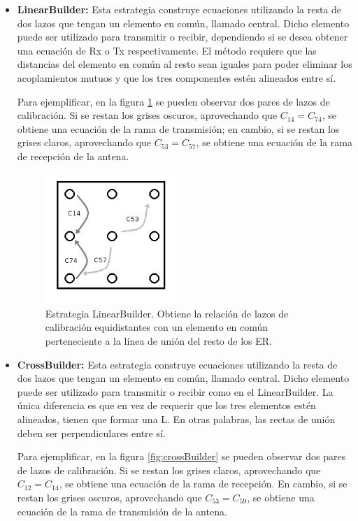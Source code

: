 \begin{itemize}
	\item \textbf{LinearBuilder:} Esta estrategia construye ecuaciones utilizando la resta de dos lazos que tengan un elemento en 
		común, llamado central. Dicho elemento puede ser utilizado para transmitir o recibir, dependiendo si se desea obtener una 
        ecuación de Rx o Tx respectivamente. El método requiere que las distancias del elemento en común al resto sean iguales
		para poder eliminar los acoplamientos mutuos y que los tres componentes estén alineados entre sí.
         
		Para ejemplificar, en la figura \ref{fig:linealBuilder} se pueden observar dos pares de lazos de calibración. Si se
		restan los grises oscuros, aprovechando que $C_{14} = C_{74}$, se obtiene una ecuación de la rama de transmisión; en
		cambio, si se restan los grises claros, aprovechando que $C_{53} = C_{57}$, se obtiene una ecuación de la rama de
		recepción de la antena.
			
		\begin{figure}[H]
		 \centering
		 \includegraphics[width=5cm]{gfx/linearBuilder.png}
		 \caption{Estrategia LinearBuilder. Obtiene la relación de lazos de calibración equidistantes con un elemento en común
		 perteneciente a la línea de unión del resto de los ER.}
		 \label{fig:linealBuilder}
		\end{figure}

	\item \textbf{CrossBuilder:} Esta estrategia construye ecuaciones utilizando la resta de dos lazos que tengan un elemento en 
		común, llamado central. Dicho elemento puede ser utilizado para transmitir o recibir como en el LinearBuilder. La única 
        diferencia es que en vez de requerir que los tres elementos estén alineados, tienen que formar una L. En otras palabras,
        las rectas de unión deben ser perpendiculares entre sí.
		
        Para ejemplificar, en la figura \ref{fig:crossBuilder} se pueden observar dos pares de lazos de calibración. Si se
		restan los grises claros, aprovechando que $C_{12} = C_{14}$, se obtiene una ecuación de la rama de recepción. En cambio, 
        si se restan los grises oscuros, aprovechando que $C_{53} = C_{59}$, se obtiene una ecuación de la rama de transmisión de
		la antena.


\end{itemize}
